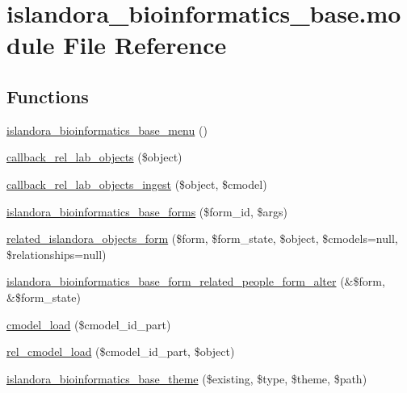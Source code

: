 \hypertarget{islandora__bioinformatics__base_8module}{\section{islandora\+\_\+bioinformatics\+\_\+base.\+module File Reference}
\label{islandora__bioinformatics__base_8module}
}
\subsection*{Functions}
\begin{DoxyCompactItemize}
\item 
\hyperlink{islandora__bioinformatics__base_8module_a34856467f23719cd8eaf851f85ccf7e8}{islandora\+\_\+bioinformatics\+\_\+base\+\_\+menu} ()
\item 
\hyperlink{islandora__bioinformatics__base_8module_a3fb252ccd00cb091a98a225e9886e4ac}{callback\+\_\+rel\+\_\+lab\+\_\+objects} (\$object)
\item 
\hyperlink{islandora__bioinformatics__base_8module_aa70457879f9d4e51f9e8995d2e60b4eb}{callback\+\_\+rel\+\_\+lab\+\_\+objects\+\_\+ingest} (\$object, \$cmodel)
\item 
\hyperlink{islandora__bioinformatics__base_8module_a2e95f32f792ce2fcd79c32895fcdbe43}{islandora\+\_\+bioinformatics\+\_\+base\+\_\+forms} (\$form\+\_\+id, \$args)
\item 
\hyperlink{islandora__bioinformatics__base_8module_a746c0835872899ef0101a8a047c8c505}{related\+\_\+islandora\+\_\+objects\+\_\+form} (\$form, \$form\+\_\+state, \$object, \$cmodels=null, \$relationships=null)
\item 
\hyperlink{islandora__bioinformatics__base_8module_a833d478f4f75aec1a655731d56a9524d}{islandora\+\_\+bioinformatics\+\_\+base\+\_\+form\+\_\+related\+\_\+people\+\_\+form\+\_\+alter} (\&\$form, \&\$form\+\_\+state)
\item 
\hyperlink{islandora__bioinformatics__base_8module_a1f0c9c90de4c35b92c19c63a7cbe74b4}{cmodel\+\_\+load} (\$cmodel\+\_\+id\+\_\+part)
\item 
\hyperlink{islandora__bioinformatics__base_8module_abaa5d1481d1ed7e3ca134bb436b0c325}{rel\+\_\+cmodel\+\_\+load} (\$cmodel\+\_\+id\+\_\+part, \$object)
\item 
\hyperlink{islandora__bioinformatics__base_8module_a76e704c8060620f768f46bd4bacb05e0}{islandora\+\_\+bioinformatics\+\_\+base\+\_\+theme} (\$existing, \$type, \$theme, \$path)

\end{DoxyCompactItemize}
